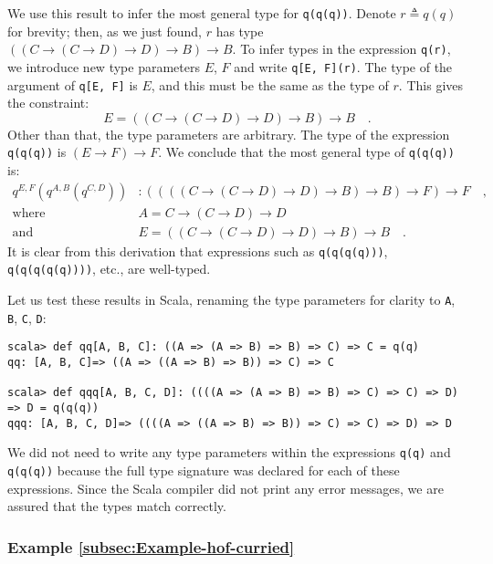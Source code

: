 We use this result to infer the most general type for \lstinline!q(q(q))!.
Denote $r\triangleq q(q)$ for brevity; then, as we just found, $r$
has type $\left(\left(C\rightarrow\left(C\rightarrow D\right)\rightarrow D\right)\rightarrow B\right)\rightarrow B$.
To infer types in the expression \lstinline!q(r)!, we introduce new
type parameters $E$, $F$ and write \lstinline!q[E, F](r)!. The
type of the argument of \lstinline!q[E, F]! is $E$, and this must
be the same as the type of $r$. This gives the constraint:
\[
E=\left(\left(C\rightarrow\left(C\rightarrow D\right)\rightarrow D\right)\rightarrow B\right)\rightarrow B\quad.
\]
Other than that, the type parameters are arbitrary. The type of the
expression \lstinline!q(q(q))! is $\left(E\rightarrow F\right)\rightarrow F$.
We conclude that the most general type of \lstinline!q(q(q))! is:
\begin{align*}
q^{E,F}(q^{A,B}(q^{C,D})) & :\left(\left(\left(\left(C\rightarrow\left(C\rightarrow D\right)\rightarrow D\right)\rightarrow B\right)\rightarrow B\right)\rightarrow F\right)\rightarrow F\quad,\\
\text{where}\quad & A=C\rightarrow\left(C\rightarrow D\right)\rightarrow D\\
\text{and}\quad & E=\left(\left(C\rightarrow\left(C\rightarrow D\right)\rightarrow D\right)\rightarrow B\right)\rightarrow B\quad.
\end{align*}
It is clear from this derivation that expressions such as \lstinline!q(q(q(q)))!,
\lstinline!q(q(q(q(q))))!, etc., are well-typed.

Let us test these results in Scala, renaming the type parameters for
clarity to \lstinline!A!, \lstinline!B!, \lstinline!C!, \lstinline!D!:
\begin{lstlisting}
scala> def qq[A, B, C]: ((A => (A => B) => B) => C) => C = q(q)
qq: [A, B, C]=> ((A => ((A => B) => B)) => C) => C

scala> def qqq[A, B, C, D]: ((((A => (A => B) => B) => C) => C) => D) => D = q(q(q))
qqq: [A, B, C, D]=> ((((A => ((A => B) => B)) => C) => C) => D) => D
\end{lstlisting}
We did not need to write any type parameters within the expressions
\lstinline!q(q)! and \lstinline!q(q(q))! because the full type signature
was declared for each of these expressions. Since the Scala compiler
did not print any error messages, we are assured that the types match
correctly.

\subsubsection{Example \label{subsec:Example-hof-curried}\ref{subsec:Example-hof-curried}}

